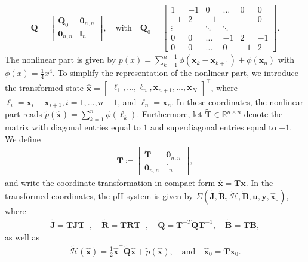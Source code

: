 \documentclass{article}
\newcommand{\newbmJ}{\widetilde{\bm{J}}}
\newcommand{\newbmR}{\widetilde{\bm{R}}}
\newcommand{\newbmQ}{\widetilde{\bm{Q}}}
\newcommand{\newbmB}{\widetilde{\bm{B}}}
\newcommand{\bmJ}{\bm{J}}
\newcommand{\bmR}{\bm{R}}
\newcommand{\bmB}{\bm{B}}
\newcommand{\bmQ}{\bm{Q}}
\newcommand{\R}{\mathbb{R}}
\newcommand{\curlyH}{\mathcal{H}}
\newcommand{\statex}{{\bm x}}
\newcommand{\outputy}{{\bm y}}
\newcommand{\inputu}{\bm{u}}
\newcommand{\bzero}{\mathbf{0}}
\newcommand{\SysLable}{\Sigma}
\newcommand{\FOMsize}{N}
\newcommand{\FOMsizeHalf}{n}
\newcommand{\DEIMsplitHam}{p}
\newcommand{\pH}{\textsf{pH}\xspace}
\begin{document}
	\begin{align*}
		\bmQ=
		\begin{bmatrix}
			\bmQ_0&\bzero_{\FOMsizeHalf,\FOMsizeHalf}\\
			\bzero_{\FOMsizeHalf,\FOMsizeHalf}& \mathbb{I}_{\FOMsizeHalf}
		\end{bmatrix},\quad \text{with} \quad 
		\bmQ_0=
		\begin{bmatrix}
			1 & -1& 0   & \ldots & 0 & 0\\
			-1 & 2& -1 &            &    & 0\\
			\vdots & &\ddots  & \ddots      &  & \\
			0 & 0& \ldots & -1 & 2 & -1\\
			0 & 0& \ldots & 0 & -1 & 2
		\end{bmatrix}.
	\end{align*}
	The nonlinear part is given by $\DEIMsplitHam(x) = \sum_{k=1}^{\FOMsizeHalf-1}\phi(\statex_{k}-\statex_{k+1}) +\phi(\statex_{\FOMsizeHalf})$ with
	$
	\phi(x) = \frac{1}{4}x^4.
	$
	To simplify the representation of the nonlinear part, we introduce the transformed state $\widehat{\statex}
		=
		\begin{bmatrix}
			\ell_1,\ldots,\ell_{\FOMsizeHalf},
			\statex_{\FOMsizeHalf+1},
			\ldots,
			\statex_{\FOMsize}
		\end{bmatrix}^{\top}$, where $\ell_i = \statex_{i} - \statex_{i+1},  i=1,\ldots,\FOMsizeHalf-1$, and $\ell_{\FOMsizeHalf} =\statex_{\FOMsizeHalf}$.
	In these coordinates, the nonlinear part reads $\widetilde{p}(\widehat{\statex}) =\sum_{k=1}^{\FOMsizeHalf}\phi(\ell_k)$. 
	Furthermore, let $\widetilde{\bm{T}} \in \R^{\FOMsizeHalf \times \FOMsizeHalf}$ denote the matrix with diagonal entries equal to $1$ and superdiagonal entries equal to $-1$. We define 
	\begin{align*}
		\bm{T} \coloneq \begin{bmatrix} \widetilde{\bm{T}} &\bm{0}_{\FOMsizeHalf,\FOMsizeHalf} \\
		\bm{0}_{\FOMsizeHalf,\FOMsizeHalf} &\mathbb{I}_{\FOMsizeHalf}
		\end{bmatrix},
	\end{align*}
	and write the coordinate transformation in compact form $\widehat{\statex} = \bm{T} \statex$. In the transformed coordinates, the \pH system is given by $\SysLable(\newbmJ,\newbmR,\widetilde{\curlyH},\newbmB,\inputu,\outputy,\widehat{\statex}_{0})$, where
	\begin{align*}
		\newbmJ = \bm{T} \bmJ \bm{T}^{\top}, \quad \newbmR =  \bm{T} \bmR \bm{T}^{\top}, \quad \newbmQ = \bm{T}^{-T} \bmQ \bm{T}^{-1}, \quad \newbmB = \bm{T} \bmB, 
	\end{align*}
	as well as 
	\begin{align*}
		\widetilde{\curlyH}( \widehat{\statex}) = \frac{1}{2} \widehat{\statex}^{\top}\newbmQ\widehat{\statex} +\widetilde{\DEIMsplitHam}(\widehat{\statex}), \quad \text{and} \quad 	\widehat{\statex}_{0} = \bm{T} \statex_0. 
	\end{align*}
	
\end{document}
